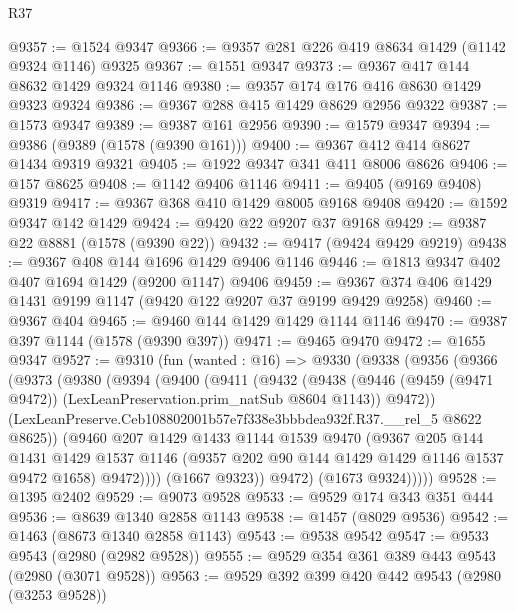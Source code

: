 \begin{lexlean}{R37}
\begin{coremodule}
@9357 := @1524 @9347
@9366 := @9357 @281 @226 @419 @8634 @1429 (@1142 @9324 @1146) @9325
@9367 := @1551 @9347
@9373 := @9367 @417 @144 @8632 @1429 @9324 @1146
@9380 := @9357 @174 @176 @416 @8630 @1429 @9323 @9324
@9386 := @9367 @288 @415 @1429 @8629 @2956 @9322
@9387 := @1573 @9347
@9389 := @9387 @161 @2956
@9390 := @1579 @9347
@9394 := @9386 (@9389 (@1578 (@9390 @161)))
@9400 := @9367 @412 @414 @8627 @1434 @9319 @9321
@9405 := @1922 @9347 @341 @411 @8006 @8626
@9406 := @157 @8625
@9408 := @1142 @9406 @1146
@9411 := @9405 (@9169 @9408) @9319
@9417 := @9367 @368 @410 @1429 @8005 @9168 @9408
@9420 := @1592 @9347 @142 @1429
@9424 := @9420 @22 @9207 @37 @9168
@9429 := @9387 @22 @8881 (@1578 (@9390 @22))
@9432 := @9417 (@9424 @9429 @9219)
@9438 := @9367 @408 @144 @1696 @1429 @9406 @1146
@9446 := @1813 @9347 @402 @407 @1694 @1429 (@9200 @1147) @9406
@9459 := @9367 @374 @406 @1429 @1431 @9199 @1147 (@9420 @122 @9207 @37 @9199 @9429 @9258)
@9460 := @9367 @404
@9465 := @9460 @144 @1429 @1429 @1144 @1146
@9470 := @9387 @397 @1144 (@1578 (@9390 @397))
@9471 := @9465 @9470
@9472 := @1655 @9347
@9527 := @9310
    (fun (wanted : @16) =>
    @9330
      (@9338
        (@9356
          (@9366
            (@9373
              (@9380
                (@9394
                  (@9400
                    (@9411
                      (@9432
                        (@9438
                          (@9446
                            (@9459 (@9471 @9472))
                            (LexLeanPreservation.prim_natSub @8604 @1143))
                          @9472))
                      (LexLeanPreserve.Ceb108802001b57e7f338e3bbbdea932f.R37.__rel_5 @8622 @8625))
                    (@9460
                      @207
                      @1429
                      @1433
                      @1144
                      @1539
                      @9470
                      (@9367
                        @205
                        @144
                        @1431
                        @1429
                        @1537
                        @1146
                        (@9357 @202 @90 @144 @1429 @1429 @1146 @1537 @9472 @1658)
                        @9472))))
                (@1667 @9323))
              @9472)
            (@1673 @9324)))))
@9528 := @1395 @2402
@9529 := @9073 @9528
@9533 := @9529 @174 @343 @351 @444
@9536 := @8639 @1340 @2858 @1143
@9538 := @1457 (@8029 @9536)
@9542 := @1463 (@8673 @1340 @2858 @1143)
@9543 := @9538 @9542
@9547 := @9533 @9543 (@2980 (@2982 @9528))
@9555 := @9529 @354 @361 @389 @443 @9543 (@2980 (@3071 @9528))
@9563 := @9529 @392 @399 @420 @442 @9543 (@2980 (@3253 @9528))

\end{coremodule}
\end{lexlean}
